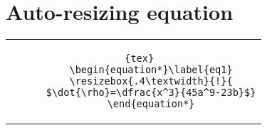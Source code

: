\section{Auto-resizing equation}
	\begin{tabular}{l | c}
	\resizebox{.4\textwidth}{!}{$\dot{\rho}=
	\dfrac{x^3}{45a^9-23b}$}
	& \begin{minipage}[m]{0.5\textwidth}
	    \begin{lstlisting}[]{tex}
	\begin{equation*}\label{eq1}
	\resizebox{.4\textwidth}{!}{
	$\dot{\rho}=\dfrac{x^3}{45a^9-23b}$}
	\end{equation*}
	    \end{lstlisting}
	\end{minipage}
	\end{tabular}